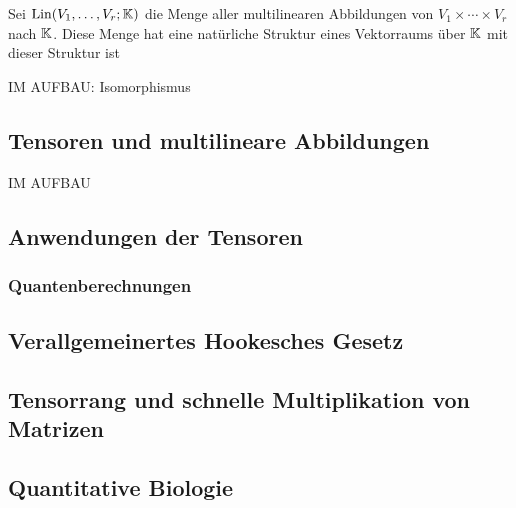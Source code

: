 	Sei $\operatorname{Lin}(V_1,\ldots,V_r ; \mathbb K)$ die Menge aller multilinearen Abbildungen von $V_1 \times \cdots \times V_r$ nach $\mathbb K$.
	Diese Menge hat eine natürliche Struktur eines Vektorraums über $\mathbb K$ mit dieser Struktur ist 
	
	IM AUFBAU: Isomorphismus 
	
	\subsection{Tensoren und multilineare Abbildungen} 
	
	IM AUFBAU 
	
	
	\subsection{Anwendungen der Tensoren} 
	
	\subsubsection{Quantenberechnungen} 
	
	
	\subsection{Verallgemeinertes Hookesches Gesetz} 
	
	\subsection{ Tensorrang und schnelle Multiplikation von Matrizen} 
	
	\subsection{Quantitative Biologie}
	
	
	
